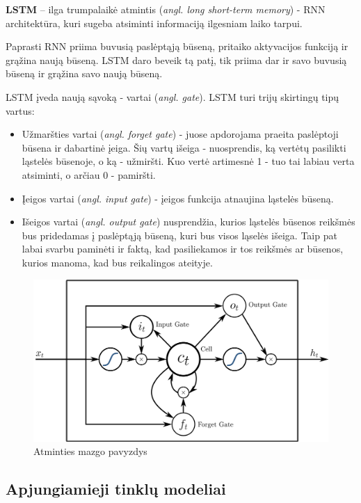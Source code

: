 \documentclass{VUMIFPSbakalaurinis}
\begin{document}
\textbf{LSTM} – ilga trumpalaikė atmintis (\textit{angl. long short-term memory}) - RNN architektūra, kuri sugeba atsiminti informaciją ilgesniam laiko tarpui. 

Paprasti RNN priima buvusią paslėptąją būseną, pritaiko aktyvacijos funkciją ir grąžina naują būseną. LSTM daro beveik tą patį, tik priima dar ir savo buvusią būseną ir grąžina savo naują būseną. 

LSTM įveda naują sąvoką - vartai (\textit{angl. gate}). LSTM turi trijų skirtingų tipų vartus:

\begin{itemize}
	\item Užmaršties vartai (\textit{angl. forget gate}) - juose apdorojama praeita paslėptoji būsena ir dabartinė įeiga. Šių vartų išeiga - nuosprendis, ką vertėtų pasilikti ląstelės būsenoje, o ką - užmiršti. Kuo vertė artimesnė 1 - tuo tai labiau verta atsiminti, o arčiau 0 - pamiršti.
	\item Įeigos vartai (\textit{angl. input gate}) - įeigos funkcija atnaujina ląstelės būseną.
	\item Išeigos vartai (\textit{angl. output gate}) nusprendžia, kurios ląstelės būsenos reikšmės bus pridedamas į paslėptąją būseną, kuri bus visos ląselės išeiga. Taip pat labai svarbu paminėti ir faktą, kad pasiliekamos ir tos reikšmės ar būsenos, kurios manoma, kad bus reikalingos ateityje.
\end{itemize}


\begin{figure}
	\centering
	\includegraphics[scale=0.12]{img/lstm}
	\caption{Atminties mazgo pavyzdys}
	\label{img:lstm}
\end{figure}

\subsection{Apjungiamieji tinklų modeliai}
\end{document}
